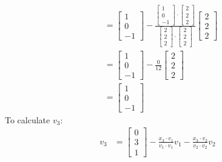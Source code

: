 \documentclass[11pt]{article}
\theoremstyle{definition}
\begin{document}
\begin{enumerate}
\begin{align*}
            & = \begin{bmatrix} 1 \\ 0 \\ -1 \end{bmatrix} - \frac{\begin{bmatrix} 1 \\ 0 \\ -1 \end{bmatrix} \cdot \begin{bmatrix} 2 \\ 2 \\ 2 \end{bmatrix}}{\begin{bmatrix} 2 \\ 2 \\ 2 \end{bmatrix} \cdot \begin{bmatrix} 2 \\ 2 \\ 2 \end{bmatrix}}\begin{bmatrix} 2 \\ 2 \\ 2 \end{bmatrix}\\
            & = \begin{bmatrix} 1 \\ 0 \\ -1 \end{bmatrix} - \frac{0}{12}\begin{bmatrix} 2 \\ 2 \\ 2 \end{bmatrix}\\
            & = \begin{bmatrix} 1 \\ 0 \\ -1 \end{bmatrix} 
        \end{align*}
        To calculate $v_3$:
        \begin{align*}
            v_3
            & = \begin{bmatrix} 0 \\ 3 \\ 1 \end{bmatrix} - \frac{x_3 \cdot v_1}{v_1 \cdot v_1}v_1 - \frac{x_3 \cdot v_2}{v_2 \cdot v_2}v_2 \\

\end{align*}
\end{enumerate}
\end{document}
